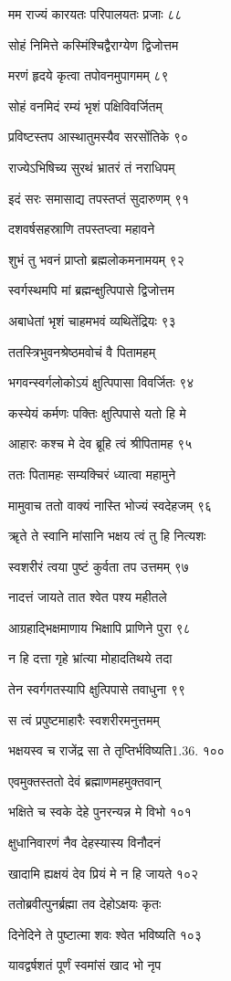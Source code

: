 मम राज्यं कारयतः परिपालयतः प्रजाः ८८

सोहं निमित्ते कस्मिंश्चिद्वैराग्येण द्विजोत्तम

मरणं हृदये कृत्वा तपोवनमुपागमम् ८९

सोहं वनमिदं रम्यं भृशं पक्षिविवर्जितम्

प्रविष्टस्तप आस्थातुमस्यैव सरसोंतिके ९०

राज्येऽभिषिच्य सुरथं भ्रातरं तं नराधिपम्

इदं सरः समासाद्य तपस्तप्तं सुदारुणम् ९१

दशवर्षसहस्राणि तपस्तप्त्वा महावने

शुभं तु भवनं प्राप्तो ब्रह्मलोकमनामयम् ९२

स्वर्गस्थमपि मां ब्रह्मन्क्षुत्पिपासे द्विजोत्तम

अबाधेतां भृशं चाहमभवं व्यथितेंद्रियः ९३

ततस्त्रिभुवनश्रेष्ठमवोचं वै पितामहम्

भगवन्स्वर्गलोकोऽयं क्षुत्पिपासा विवर्जितः ९४

कस्येयं कर्मणः पक्तिः क्षुत्पिपासे यतो हि मे

आहारः कश्च मे देव ब्रूहि त्वं श्रीपितामह ९५

ततः पितामहः सम्यक्चिरं ध्यात्वा महामुने

मामुवाच ततो वाक्यं नास्ति भोज्यं स्वदेहजम् ९६

ॠते ते स्वानि मांसानि भक्षय त्वं तु हि नित्यशः

स्वशरीरं त्वया पुष्टं कुर्वता तप उत्तमम् ९७

नादत्तं जायते तात श्वेत पश्य महीतले

आग्रहाद्भिक्षमाणाय भिक्षापि प्राणिने पुरा ९८

न हि दत्ता गृहे भ्रांत्या मोहादतिथये तदा

तेन स्वर्गगतस्यापि क्षुत्पिपासे तवाधुना ९९

स त्वं प्रपुष्टमाहारैः स्वशरीरमनुत्तमम्

भक्षयस्व च राजेंद्र सा ते तृप्तिर्भविष्यति1.36. १००

एवमुक्तस्ततो देवं ब्रह्माणमहमुक्तवान्

भक्षिते च स्वके देहे पुनरन्यन्न मे विभो १०१

क्षुधानिवारणं नैव देहस्यास्य विनौदनं

खादामि ह्यक्षयं देव प्रियं मे न हि जायते १०२

ततोब्रवीत्पुनर्ब्रह्मा तव देहोऽक्षयः कृतः

दिनेदिने ते पुष्टात्मा शवः श्वेत भविष्यति १०३

यावद्वर्षशतं पूर्णं स्वमांसं खाद भो नृप

